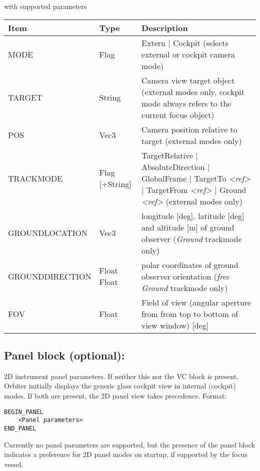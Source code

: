 \documentclass[Orbiter Developer Manual.tex]{subfiles}
\begin{document}
\noindent
with supported parameters

\begin{table}[H]
	\centering
	\begin{tabularx}{\textwidth}{ |l|l|X| }
	\hline\rule{0pt}{2ex}
	\textbf{Item} & \textbf{Type} & \textbf{Description}\\
	\hline\rule{0pt}{2ex}
	MODE & Flag & Extern | Cockpit (selects external or cockpit camera mode)\\
	\hline\rule{0pt}{2ex}
	TARGET & String & Camera view target object (external modes only, cockpit mode always refers to the current focus object)\\
	\hline\rule{0pt}{2ex}
	POS & Vec3 & Camera position relative to target (external modes only)\\
	\hline\rule{0pt}{2ex}
	TRACKMODE & Flag [+String] & TargetRelative | AbsoluteDirection | GlobalFrame | TargetTo \textit{<ref>} | TargetFrom \textit{<ref>} | Ground \textit{<ref>} (external modes only)\\
	\hline\rule{0pt}{2ex}
	GROUNDLOCATION & Vec3 & longitude [deg], latitude [deg] and altitude [m] of ground observer (\textit{Ground} trackmode only)\\
	\hline\rule{0pt}{2ex}
	GROUNDDIRECTION & Float Float & polar coordinates of ground observer orientation (\textit{free Ground} trackmode only)\\
	\hline\rule{0pt}{2ex}
	FOV & Float & Field of view (angular aperture from from top to bottom of view window) [deg]\\
	\hline
	\end{tabularx}
\end{table}

\subsection*{Panel block (optional):}
2D instrument panel parameters. If neither this nor the VC block is present, Orbiter initially displays the generic glass cockpit view in internal (cockpit) modes. If both are present, the 2D panel view takes precedence. Format:

\begin{lstlisting}[language=OSFS]
BEGIN_PANEL
	<Panel parameters>
END_PANEL
\end{lstlisting}

\noindent
Currently no panel parameters are supported, but the presence of the panel block indicates a preference for 2D panel modes on startup, if supported by the focus vessel.
\end{document}
